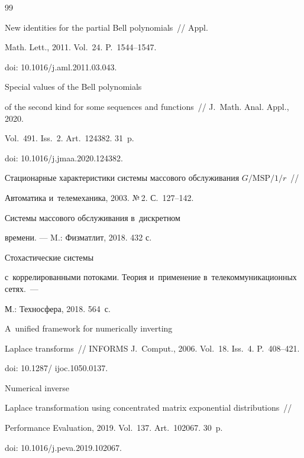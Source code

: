 {{\begin{thebibliography}{99}

 New identities for the partial Bell polynomials~/\!\!/ Appl. 

Math. Lett., 2011. Vol.~24. P.~1544--1547.

doi: 10.1016\!/\!j.aml.2011.03.043.




 Special values of the Bell polynomials 

of the second kind for some sequences and functions~/\!\!/ J.~Math. Anal. Appl., 2020. 

Vol.~491. Iss.~2. Art.~124382. 31~p.

doi: 10.1016\!/\!j.jmaa.2020.124382.







Стационарные характеристики системы массового обслуживания $G/\mathrm{MSP}/1/r$~/\!\!/ 

Автоматика и~телемеханика, 2003. №\,2. С.~127--142.








 Системы массового обслуживания в~дискретном 

времени. --- M.: Физматлит, 2018. 432 с.




 Стохастические системы 

с~коррелированными потоками. Теория и~применение в~телекоммуникационных сетях.~--- 

М.: Техносфера, 2018.  564~с.




 A~unified framework for numerically inverting

Laplace transforms~/\!\!/ INFORMS J.~Comput., 2006. Vol.~18. Iss.~4. P.~408--421.

doi: 10.1287\!/ ijoc.1050.0137. 




 Numerical inverse 

Laplace transformation using concentrated matrix exponential distributions~/\!\!/ 

Performance Evaluation, 2019. Vol.~137. Art.~102067. 30~p.

doi: 10.1016\!/\!j.peva.2019.102067.

  \end{thebibliography}

} }







